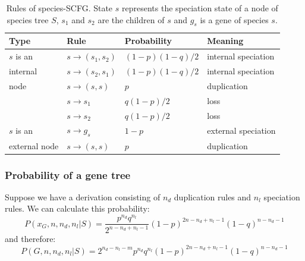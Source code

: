 \documentclass[pdftex,10pt]{article}
\begin{document}
\begin{table}
\begin{center}
\begin{tabular}{l|lll}
\hline
Type & Rule & Probability & Meaning \\
\hline
$s$ is an  & $s\to(s_1,s_2)$ & $(1-p)(1-q)/2$ & internal speciation \\
internal   & $s\to(s_2,s_1)$ & $(1-p)(1-q)/2$ & internal speciation \\
node       & $s\to(s,s)$ & $p$ & duplication \\
           & $s\to s_1$ & $q(1-p)/2$ & loss \\
           & $s\to s_2$ & $q(1-p)/2$ & loss \\
\hline
$s$ is an  & $s\to g_s$ & $1-p$ & external speciation \\
external node & $s\to(s,s)$ & $p$ & duplication \\
\hline
\end{tabular}
\caption{Rules of species-SCFG. State $s$ represents the speciation
  state of a node of species tree $S$, $s_1$ and $s_2$ are the children
  of $s$ and $g_s$ is a gene of species $s$.}\label{tab:scfgrule}
\end{center}
\end{table}

\subsubsection{Probability of a gene tree}

Suppose we have a derivation consisting of $n_d$ duplication rules and
$n_l$ speciation rules. We can calculate this probability:
\begin{equation*}
  P(x_G,n,n_d,n_l|S)=\frac{p^{n_d}q^{n_l}}{2^{n-n_d+n_l-1}}(1-p)^{2n-n_d+n_l-1}(1-q)^{n-n_d-1}
\end{equation*}
and therefore:
\begin{equation}\label{equ:p-pi1}
  P(G,n,n_d,n_l|S)=2^{n_d-n_l-m}p^{n_d}q^{n_l}(1-p)^{2n-n_d+n_l-1}(1-q)^{n-n_d-1}
\end{equation}
\end{document}
